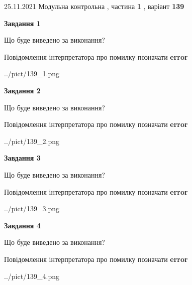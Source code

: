 \documentclass[10pt, ukrainian]{article}
\begin{document}
{25.11.2021 Модульна контрольна , частина \textbf { 1 }, варіант  \No \textbf { 139 }\par}
{
\begin {large}

{\begin {center}\textbf{Завдання 1}\end {center}}\par
Що буде виведено за виконання? \par
Повідомлення інтерпретатора про помилку позначати \textbf{error}

\begin{center}
	{../pict/139_1.png}
\end{center}
\newpage

{\begin {center}\textbf{Завдання 2}\end {center}}\par
Що буде виведено за виконання? \par
Повідомлення інтерпретатора про помилку позначати \textbf{error}

\begin{center}
	{../pict/139_2.png}
\end{center}
\newpage

{\begin {center}\textbf{Завдання 3}\end {center}}\par
Що буде виведено за виконання? \par
Повідомлення інтерпретатора про помилку позначати \textbf{error}

\begin{center}
	{../pict/139_3.png}
\end{center}
\newpage

{\begin {center}\textbf{Завдання 4}\end {center}}\par
Що буде виведено за виконання? \par
Повідомлення інтерпретатора про помилку позначати \textbf{error}

\begin{center}
	{../pict/139_4.png}
\end{center}
\newpage


\end{large}}
\end{document}
